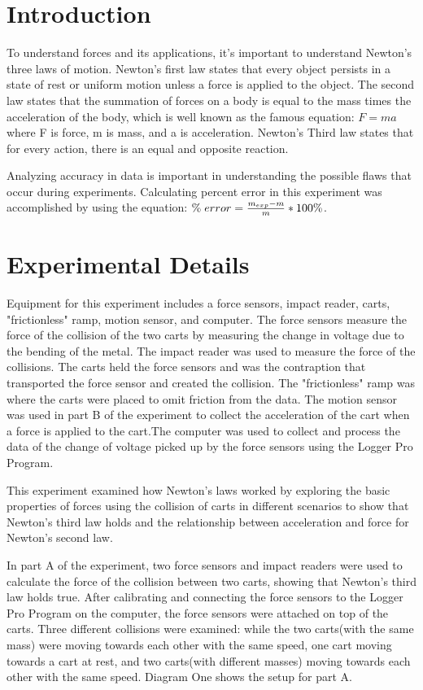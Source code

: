 \documentclass[aps,letterpaper,11pt]{revtex4}
\begin{document}
\section{Introduction}

To understand forces and its applications, it's important to understand Newton's three laws of motion. Newton's first law states that every object persists in a state of rest or uniform motion unless a force is applied to the object. The second law states that the summation of forces on a body is equal to the mass times the acceleration of the body, which is well known as the famous equation: $F = ma$ where F is force, m is mass, and a is acceleration. Newton's Third law states that for every action, there is an equal and opposite reaction. 

Analyzing accuracy in data is important in understanding the possible flaws that occur during experiments. Calculating percent error in this experiment was accomplished by using the equation: $\%\hspace{1mm}error = \frac{m_{exp}-m}{m}*100\%$.


\section{Experimental Details}

Equipment for this experiment includes a force sensors, impact reader, carts, "frictionless" ramp, motion sensor, and computer. The force sensors measure the force of the collision of the two carts by measuring the change in voltage due to the bending of the metal. The impact reader was used to measure the force of the collisions. The carts held the force sensors and was the contraption that transported the force sensor and created the collision. The "frictionless" ramp was where the carts were placed to omit friction from the data. The motion sensor was used in part B of the experiment to collect the acceleration of the cart when a force is applied to the cart.The computer was used to collect and process the data of the change of voltage picked up by the force sensors using the Logger Pro Program. 

This experiment examined how Newton's laws worked by exploring the basic properties of forces using the collision of carts in different scenarios to show that Newton's third law holds and the relationship between acceleration and force for Newton's second law. 

In part A of the experiment, two force sensors and impact readers were used to calculate the force of the collision between two carts, showing that Newton's third law holds true. After calibrating and connecting the force sensors to the Logger Pro Program on the computer, the force sensors were attached on top of the carts. Three different collisions were examined: while the two carts(with the same mass) were moving towards each other with the same speed, one cart moving towards a cart at rest, and two carts(with different masses) moving towards each other with the same speed. Diagram One shows the setup for part A.
\end{document}
